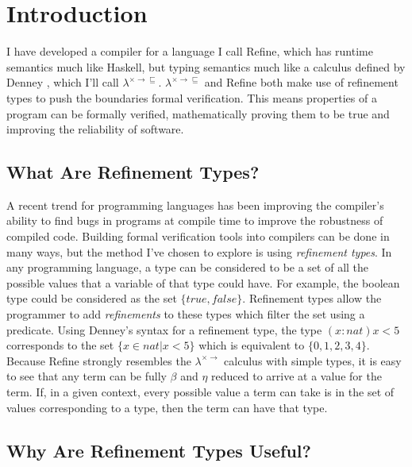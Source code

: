 \section{Introduction}

I have developed a compiler for a language I call Refine,
which has runtime semantics much like Haskell, but typing semantics much like a calculus defined
by Denney \cite{denney98}, which I'll call $\lambda^{\times \rightarrow \sqsubseteq}$.
$\lambda^{\times \rightarrow \sqsubseteq}$ and Refine both make use of refinement types to push
the boundaries formal verification.
This means properties of a program can be formally verified, mathematically proving them to be true
and improving the reliability of software.

\subsection{What Are Refinement Types?}

A recent trend for programming languages has been improving the compiler's ability to find
bugs in programs at compile time to improve the robustness of compiled code.
Building formal verification tools into compilers can be done in many ways, but the method
I've chosen to explore is using \textit{refinement types}.
In any programming language, a type can be considered to be a set of all the possible values
that a variable of that type could have.
For example, the boolean type could be considered as the set $\{true, false\}$.
Refinement types allow the programmer to add \textit{refinements} to these types which
filter the set using a predicate.
Using Denney's syntax for a refinement type, the type
$(x:nat)x<5$ corresponds to the set $\{x \in nat | x < 5\}$ which is equivalent to
$\{0, 1, 2, 3, 4\}$.
Because Refine strongly resembles the $\lambda^{\times \rightarrow}$ calculus
with simple types, it is easy to see that any term can be fully $\beta$ and $\eta$ reduced to
arrive at a value for the term.
If, in a given context, every possible value a term can take is in the set of values corresponding to
a type, then the term can have that type.

\subsection{Why Are Refinement Types Useful?}

